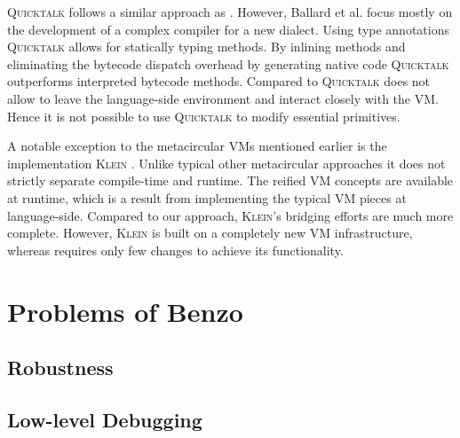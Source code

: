 \textsc{Quicktalk} \cite{Ball86a} follows a similar approach as \WF.
However, Ballard et al. focus mostly on the development of a complex compiler for a new \ST dialect.
Using type annotations \textsc{Quicktalk} allows for statically typing methods.
By inlining methods and eliminating the bytecode dispatch overhead by generating native code \textsc{Quicktalk} outperforms interpreted bytecode methods.
Compared to \WF \textsc{Quicktalk} does not allow to leave the language-side environment and interact closely with the VM.
Hence it is not possible to use \textsc{Quicktalk} to modify essential primitives.

A notable exception to the metacircular VMs mentioned earlier is the \Self implementation \textsc{Klein} \cite{Unga05a}.
Unlike typical other metacircular approaches it does not strictly separate compile-time and runtime.
The reified VM concepts are available at runtime, which is a result from implementing the typical VM pieces at language-side.
Compared to our approach, \textsc{Klein}'s bridging efforts are much more complete.
However, \textsc{Klein} is built on a completely new VM infrastructure, whereas \B requires only few changes to achieve its functionality.


\section{Problems of Benzo}


\subsection{Robustness}


\subsection{Low-level Debugging}

